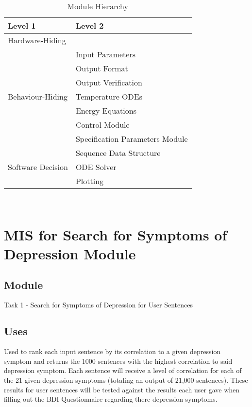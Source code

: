 \documentclass[12pt, titlepage]{article}
\begin{document}
\begin{table}[h!]
\centering
\begin{tabular}{p{} p{}}
\toprule
\textbf{Level 1} & \textbf{Level 2}\\
\midrule

{Hardware-Hiding} & ~ \\
\midrule

\multirow{7}{0.3\textwidth}{Behaviour-Hiding} & Input Parameters\\
& Output Format\\
& Output Verification\\
& Temperature ODEs\\
& Energy Equations\\ 
& Control Module\\
& Specification Parameters Module\\
\midrule

\multirow{3}{0.3\textwidth}{Software Decision} & {Sequence Data Structure}\\
& ODE Solver\\
& Plotting\\
\bottomrule

\end{tabular}
\caption{Module Hierarchy}
\label{TblMH}
\end{table}

\newpage
~\newpage

\section{MIS for Search for Symptoms of Depression Module} \label{Module} 

\subsection{Module}

Task 1 - Search for Symptoms of Depression for User Sentences 


\subsection{Uses}

Used to rank each input sentence by its correlation to a given depression symptom and returns the 1000 sentences with the highest correlation to said depression symptom. Each sentence will receive a level of correlation for each of the 21 given depression symptoms (totaling an output of 21,000 sentences). These results for user sentences will be tested against the results each user gave when filling out the BDI Questionnaire regarding there depression symptoms.
\end{document}
